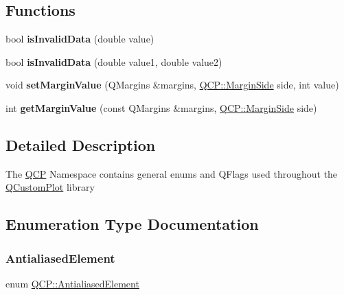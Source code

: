 \subsection*{Functions}
\begin{DoxyCompactItemize}
\item 
\mbox{\label{namespace_q_c_p_a07ab701c05329089f933b9cae2638a63}} 
bool {\bfseries is\+Invalid\+Data} (double value)
\item 
\mbox{\label{namespace_q_c_p_a728903e5c3dd17847bee280f4005496f}} 
bool {\bfseries is\+Invalid\+Data} (double value1, double value2)
\item 
\mbox{\label{namespace_q_c_p_afbf6e3084c108f2bb4372107945ee82f}} 
void {\bfseries set\+Margin\+Value} (Q\+Margins \&margins, \hyperlink{namespace_q_c_p_a7e487e3e2ccb62ab7771065bab7cae54}{Q\+C\+P\+::\+Margin\+Side} side, int value)
\item 
\mbox{\label{namespace_q_c_p_a23a2679d3495c444acc26acc61e35b5b}} 
int {\bfseries get\+Margin\+Value} (const Q\+Margins \&margins, \hyperlink{namespace_q_c_p_a7e487e3e2ccb62ab7771065bab7cae54}{Q\+C\+P\+::\+Margin\+Side} side)
\end{DoxyCompactItemize}


\subsection{Detailed Description}
The \hyperlink{namespace_q_c_p}{Q\+CP} Namespace contains general enums and Q\+Flags used throughout the \hyperlink{class_q_custom_plot}{Q\+Custom\+Plot} library 

\subsection{Enumeration Type Documentation}
\mbox{\label{namespace_q_c_p_ae55dbe315d41fe80f29ba88100843a0c}} 
\subsubsection{\texorpdfstring{Antialiased\+Element}{AntialiasedElement}}
{\footnotesize\ttfamily enum \hyperlink{namespace_q_c_p_ae55dbe315d41fe80f29ba88100843a0c}{Q\+C\+P\+::\+Antialiased\+Element}}

